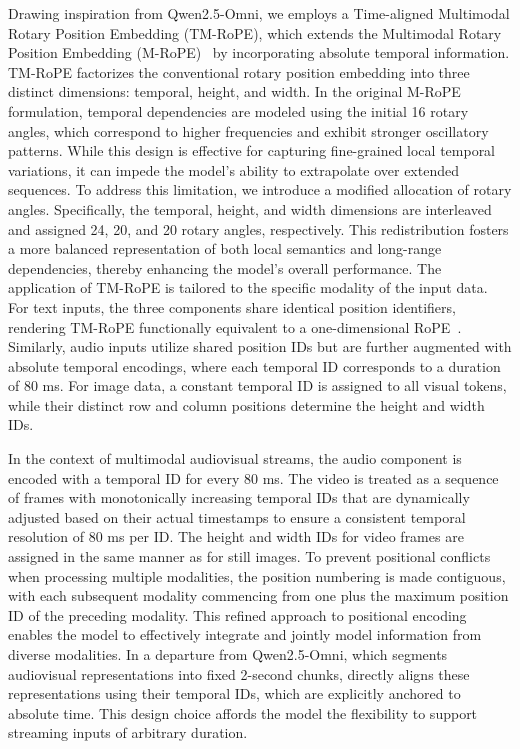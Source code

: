 Drawing inspiration from Qwen2.5-Omni, we employs a Time-aligned Multimodal Rotary Position Embedding (TM-RoPE), which extends the Multimodal Rotary Position Embedding (M-RoPE)~\citep{qwenvl} by incorporating absolute temporal information. TM-RoPE factorizes the conventional rotary position embedding into three distinct dimensions: temporal, height, and width. In the original M-RoPE formulation, temporal dependencies are modeled using the initial 16 rotary angles, which correspond to higher frequencies and exhibit stronger oscillatory patterns. While this design is effective for capturing fine-grained local temporal variations, it can impede the model's ability to extrapolate over extended sequences. To address this limitation, we introduce a modified allocation of rotary angles. Specifically, the temporal, height, and width dimensions are interleaved and assigned 24, 20, and 20 rotary angles, respectively. This redistribution fosters a more balanced representation of both local semantics and long-range dependencies, thereby enhancing the model's overall performance. The application of TM-RoPE is tailored to the specific modality of the input data. For text inputs, the three components share identical position identifiers, rendering TM-RoPE functionally equivalent to a one-dimensional RoPE~\citep{rope}. Similarly, audio inputs utilize shared position IDs but are further augmented with absolute temporal encodings, where each temporal ID corresponds to a duration of 80 ms. For image data, a constant temporal ID is assigned to all visual tokens, while their distinct row and column positions determine the height and width IDs.

In the context of multimodal audiovisual streams, the audio component is encoded with a temporal ID for every 80 ms. The video is treated as a sequence of frames with monotonically increasing temporal IDs that are dynamically adjusted based on their actual timestamps to ensure a consistent temporal resolution of 80 ms per ID. The height and width IDs for video frames are assigned in the same manner as for still images. To prevent positional conflicts when processing multiple modalities, the position numbering is made contiguous, with each subsequent modality commencing from one plus the maximum position ID of the preceding modality. This refined approach to positional encoding enables the model to effectively integrate and jointly model information from diverse modalities. In a departure from Qwen2.5-Omni, which segments audiovisual representations into fixed 2-second chunks, \method directly aligns these representations using their temporal IDs, which are explicitly anchored to absolute time. This design choice affords the model the flexibility to support streaming inputs of arbitrary duration.



